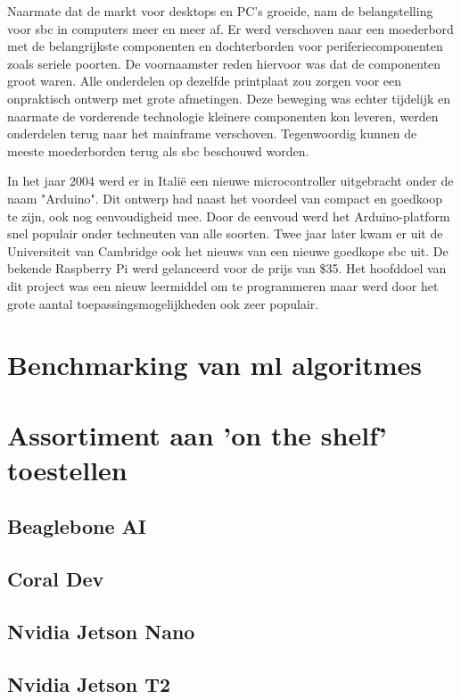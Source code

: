 	Naarmate dat de markt voor desktops en PC's groeide, nam de belangstelling voor \gls{sbc} in computers meer en meer af. Er werd verschoven naar een moederbord met de belangrijkste componenten en dochterborden voor periferiecomponenten zoals seriele poorten. De voornaamster reden hiervoor was dat de componenten groot waren. Alle onderdelen op dezelfde printplaat zou zorgen voor een onpraktisch ontwerp met grote afmetingen. Deze beweging was echter tijdelijk en naarmate de vorderende technologie kleinere componenten kon leveren, werden onderdelen terug naar het mainframe verschoven. Tegenwoordig kunnen de meeste moederborden terug als \gls{sbc} beschouwd worden. 

	
	In het jaar 2004 werd er in Itali\"e een nieuwe microcontroller uitgebracht onder de naam "Arduino". Dit ontwerp had naast het voordeel van compact en goedkoop te zijn, ook nog eenvoudigheid mee. Door de eenvoud werd het Arduino-platform snel populair onder techneuten van alle soorten. 
	Twee jaar later kwam er uit de Universiteit van Cambridge ook het nieuws van een nieuwe goedkope \gls{sbc} uit. De bekende Raspberry Pi werd gelanceerd voor de prijs van \$35. Het hoofddoel van dit project was een nieuw leermiddel om te programmeren maar werd door het grote aantal toepassingsmogelijkheden ook zeer populair.
	
	

\section{Benchmarking van \gls{ml} algoritmes}
\section{Assortiment aan 'on the shelf' toestellen}

	\subsection{Beaglebone AI}
	\subsection{Coral Dev }
	\subsection{Nvidia Jetson Nano}
	\subsection{Nvidia Jetson T2}
